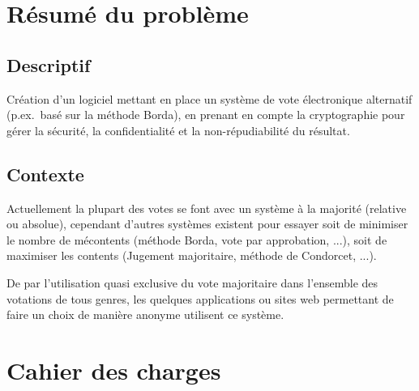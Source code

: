 \documentclass[../report]{subfiles}
\begin{document}
\section{Résumé du problème}
\subsection{Descriptif}
Création d'un logiciel mettant en place un système de vote électronique alternatif (p.ex.~basé sur la méthode Borda), en prenant en compte la cryptographie pour gérer la sécurité, la confidentialité et la non-répudiabilité du résultat.

\subsection{Contexte}
Actuellement la plupart des votes se font avec un système à la majorité (relative ou absolue), cependant d'autres systèmes existent pour essayer soit de minimiser le nombre de mécontents (méthode Borda, vote par approbation, ...), soit de maximiser les contents (Jugement majoritaire, méthode de Condorcet, ...).

De par l'utilisation quasi exclusive du vote majoritaire dans l'ensemble des votations de tous genres, les quelques applications ou sites web permettant de faire un choix de manière anonyme utilisent ce système.

\section{Cahier des charges}
\end{document}
